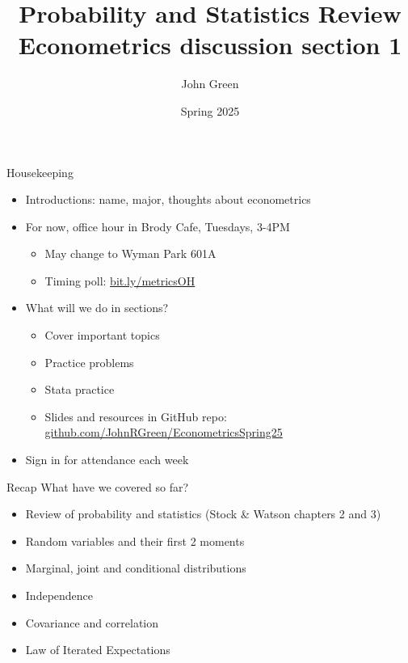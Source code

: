\documentclass[aspectratio=169]{beamer}
\title{Probability and Statistics Review \\
        \large Econometrics discussion section 1}
\author{John Green}
\date{Spring 2025}
\begin{document}
\begin{frame}
    \titlepage 
\end{frame}

\begin{frame}{Housekeeping}
    \begin{itemize}
        \item Introductions: name, major, thoughts about econometrics
        \item For now, office hour in Brody Cafe, Tuesdays, 3-4PM
        \begin{itemize}
            \item May change to Wyman Park 601A
            \item Timing poll: \href{bit.ly/metricsOH}{bit.ly/metricsOH}
        \end{itemize}
        \item What will we do in sections?
        \begin{itemize}
            \item Cover important topics
            \item Practice problems
            \item Stata practice
            \item Slides and resources in GitHub repo: \href{github.com/JohnRGreen/EconometricsSpring25}{github.com/JohnRGreen/EconometricsSpring25}
        \end{itemize}
        \item Sign in for attendance each week
    \end{itemize}
\end{frame}

\begin{frame}{Recap}
    What have we covered so far?
    \begin{itemize}
        \item Review of probability and statistics (Stock \& Watson chapters 2 and 3)
        \item Random variables and their first 2 moments
        \item Marginal, joint and conditional distributions
        \item Independence
        \item Covariance and correlation
        \item Law of Iterated Expectations
    \end{itemize}
\end{frame}
\end{document}
